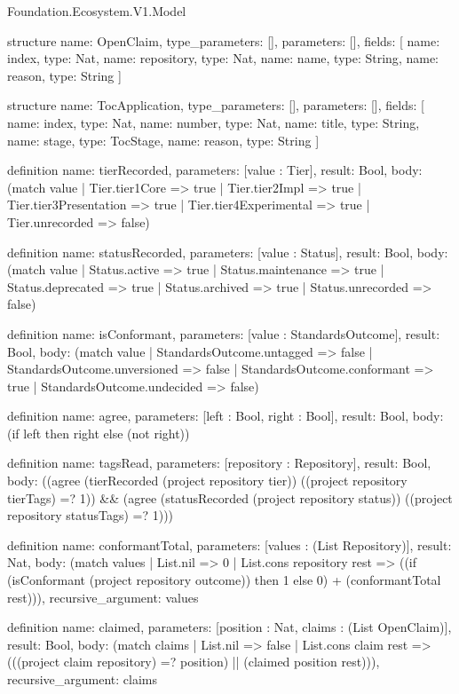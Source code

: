 \begin{lexlean}{Foundation.Ecosystem.V1.Model}
\begin{semanticmodule}
structure{
  name: OpenClaim,
  type_parameters: [],
  parameters: [],
  fields: [
    {name: index, type: Nat},
    {name: repository, type: Nat},
    {name: name, type: String},
    {name: reason, type: String}
  ]
}

structure{
  name: TocApplication,
  type_parameters: [],
  parameters: [],
  fields: [
    {name: index, type: Nat},
    {name: number, type: Nat},
    {name: title, type: String},
    {name: stage, type: TocStage},
    {name: reason, type: String}
  ]
}

definition{
  name: tierRecorded,
  parameters: [value : Tier],
  result: Bool,
  body: (match value
    | Tier.tier1Core => true
    | Tier.tier2Impl => true
    | Tier.tier3Presentation => true
    | Tier.tier4Experimental => true
    | Tier.unrecorded => false)
}

definition{
  name: statusRecorded,
  parameters: [value : Status],
  result: Bool,
  body: (match value
    | Status.active => true
    | Status.maintenance => true
    | Status.deprecated => true
    | Status.archived => true
    | Status.unrecorded => false)
}

definition{
  name: isConformant,
  parameters: [value : StandardsOutcome],
  result: Bool,
  body: (match value
    | StandardsOutcome.untagged => false
    | StandardsOutcome.unversioned => false
    | StandardsOutcome.conformant => true
    | StandardsOutcome.undecided => false)
}

definition{
  name: agree,
  parameters: [left : Bool, right : Bool],
  result: Bool,
  body: (if left then right else (not right))
}

definition{
  name: tagsRead,
  parameters: [repository : Repository],
  result: Bool,
  body: ((agree (tierRecorded (project repository tier)) ((project repository tierTags) =? 1)) && (agree (statusRecorded (project repository status)) ((project repository statusTags) =? 1)))
}

definition{
  name: conformantTotal,
  parameters: [values : (List Repository)],
  result: Nat,
  body: (match values
    | List.nil => 0
    | List.cons repository rest => ((if (isConformant (project repository outcome)) then 1 else 0) + (conformantTotal rest))),
  recursive_argument: values
}

definition{
  name: claimed,
  parameters: [position : Nat, claims : (List OpenClaim)],
  result: Bool,
  body: (match claims
    | List.nil => false
    | List.cons claim rest => (((project claim repository) =? position) || (claimed position rest))),
  recursive_argument: claims
}


\end{semanticmodule}
\end{lexlean}
